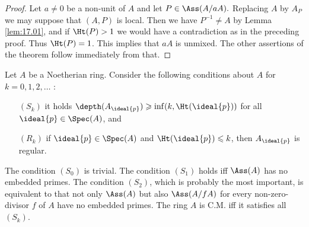 \documentclass[../main]{subfiles}
\begin{document}
\begin{proof}
Let $a\neq 0$ be a non-unit of $A$ and let $P \in\Ass(A / a A) .$ Replacing $A$ by $A_P$ we may suppose that $(A, P)$ is local. Then we have $P^{-1} \neq A$ by Lemma \ref{lem:17.01}, and if $\Ht(P)>1$ we would have a contradiction as in the preceding proof. Thus $\Ht(P)=1$. This implies that $aA$ is unmixed. The other assertions of the theorem follow immediately from that.
\end{proof}

\newparagraph Let $A$ be a Noetherian ring. Consider the following conditions about $A$ for $k=0,1,2, \ldots$ : 
\begin{enumerate}
    \item[$(S_k)$] it holds $\depth (A_{\ideal{p}}) \geqslant \inf (k, \Ht(\ideal{p}))$ for all $\ideal{p} \in \Spec(A)$, and
    \item[$(R_k)$] if $\ideal{p} \in \Spec(A)$ and $\Ht(\ideal{p}) \leqslant k$, then $A_{\ideal{p}}$ is regular.
\end{enumerate}
 The condition $(S_0)$ is trivial. The condition $(S_1)$ holds iff $\Ass(A)$ has no embedded primes. The condition $(S_2)$, which is probably the most important, is equivalent to that not only $\Ass(A)$ but also $\Ass(A/fA)$ for every non-zero-divisor $f$ of $A$ have no embedded primes. The ring $A$ is C.M. iff it satisfies all $(S_k)$.
 
\end{document}
